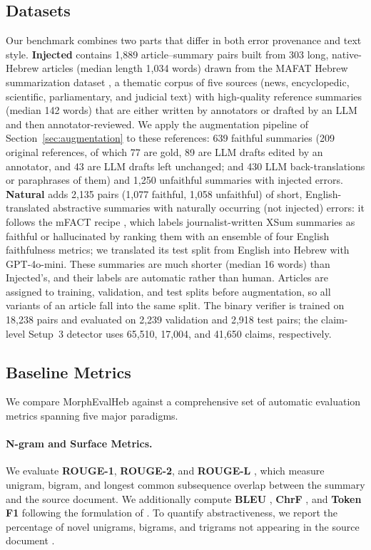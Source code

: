\documentclass[11pt]{article}
\begin{document}
\subsection{Datasets}
\label{sec:datasets}
Our benchmark combines two parts that differ in both error provenance and text style. \textbf{Injected} contains 1,889 article--summary pairs built from 303 long, native-Hebrew articles (median length 1,034 words) drawn from the MAFAT Hebrew summarization dataset \citep{mafat_dataset}, a thematic corpus of five sources (news, encyclopedic, scientific, parliamentary, and judicial text) with high-quality reference summaries (median 142 words) that are either written by annotators or drafted by an LLM and then annotator-reviewed. We apply the augmentation pipeline of Section~\ref{sec:augmentation} to these references: 639 faithful summaries (209 original references, of which 77 are gold, 89 are LLM drafts edited by an annotator, and 43 are LLM drafts left unchanged; and 430 LLM back-translations or paraphrases of them) and 1,250 unfaithful summaries with injected errors. \textbf{Natural} adds 2,135 pairs (1,077 faithful, 1,058 unfaithful) of short, English-translated abstractive summaries with naturally occurring (not injected) errors: it follows the mFACT recipe \citep{qiu2023detecting}, which labels journalist-written XSum summaries as faithful or hallucinated by ranking them with an ensemble of four English faithfulness metrics; we translated its test split from English into Hebrew with GPT-4o-mini. These summaries are much shorter (median 16 words) than Injected's, and their labels are automatic rather than human. Articles are assigned to training, validation, and test splits before augmentation, so all variants of an article fall into the same split. The binary verifier is trained on 18,238 pairs and evaluated on 2,239 validation and 2,918 test pairs; the claim-level Setup~3 detector uses 65,510, 17,004, and 41,650 claims, respectively.
\subsection{Baseline Metrics}

We compare MorphEvalHeb against a comprehensive set of automatic evaluation metrics spanning five major paradigms.

\paragraph{N-gram and Surface Metrics.}
We evaluate \textbf{ROUGE-1}, \textbf{ROUGE-2}, and \textbf{ROUGE-L} \cite{lin2004rouge}, which measure unigram, bigram, and longest common subsequence overlap between the summary and the source document. We additionally compute \textbf{BLEU} \cite{papineni2002bleu}, \textbf{ChrF} \cite{popovic2015chrf}, and \textbf{Token F1} following the formulation of \citet{honovich2022true}. To quantify abstractiveness, we report the percentage of novel unigrams, bigrams, and trigrams not appearing in the source document \citep{aharoni-etal-2023-multilingual}.
\end{document}

